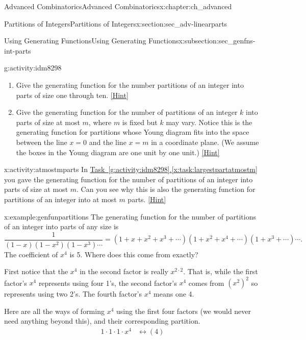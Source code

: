 \documentclass[oneside,10pt,]{book}
\numberwithin{equation}{chapter}
\newcommand{\amp}{&}
\begin{document}
\begin{chapterptx}{Advanced Combinatorics}{}{Advanced Combinatorics}{}{}{x:chapter:ch_advanced}
\begin{sectionptx}{Partitions of Integers}{}{Partitions of Integers}{}{}{x:section:sec_adv-linearparts}
\begin{subsectionptx}{Using Generating Functions}{}{Using Generating Functions}{}{}{x:subsection:sec_genfns-int-parts}
\begin{activity}{}{g:activity:idm8298}
\begin{enumerate}[font=\bfseries,label=(\alph*),ref=\alph*]
\item{}Give the generating function for the number partitions of an integer into parts of size one through ten.%
\space\hspace*{0pt}\hfill{\tiny\hyperlink{g:hint:idm8305-back}{[Hint]}}\item\label{x:task:largestpartatmostm}Give the generating function for the number of partitions of an integer \(k\) into parts of size at most \(m\), where \(m\) is fixed but \(k\) may vary. Notice this is the generating function for partitions whose Young diagram fits into the space between the line \(x=0\) and the line \(x=m\) in a coordinate plane. (We assume the boxes in the Young diagram are one unit by one unit.)%
\space\hspace*{0pt}\hfill{\tiny\hyperlink{g:hint:idm8319-back}{[Hint]}}\end{enumerate}
\end{activity}
\begin{activity}{}{x:activity:atmostmparts}%
In \hyperref[x:task:largestpartatmostm]{Task~\ref{g:activity:idm8298}.\ref{x:task:largestpartatmostm}} you gave the generating function for the number of partitions of an integer into parts of size at most \(m\). Can you see why this is also the generating function for partitions of an integer into at most \(m\) parts.%
\space\hspace*{0pt}\hfill{\tiny\hyperlink{g:hint:idm8331-back}{[Hint]}}\end{activity}
\begin{example}{}{x:example:genfunpartitions}%
The generating function for the number of partitions of an integer into parts of any size is%
\begin{equation*}
\frac{1}{(1-x)(1-x^2)(1-x^3) \cdots} = (1+x+x^2+x^3+\cdots)(1+x^2+x^4+\cdots)(1+x^3+\cdots)\cdots\text{.}
\end{equation*}
The coefficient of \(x^4\) is 5.  Where does this come from exactly?%
\par
First notice that the \(x^4\) in the second factor is really \(x^{2\cdot 2}\).  That is, while the first factor's \(x^4\) represents using four 1's, the second factor's \(x^4\) comes from \((x^2)^2\) so represents using two 2's. The fourth factor's \(x^4\) means one 4.%
\par
Here are all the ways of forming \(x^4\) using the first four factors (we would never need anything beyond this), and their corresponding partition.%
\begin{align*}
1\cdot1 \cdot 1 \cdot  x^4 \amp \leftrightarrow  (4) \\

\end{align*}
\end{example}
\end{subsectionptx}
\end{sectionptx}
\end{chapterptx}
\end{document}
